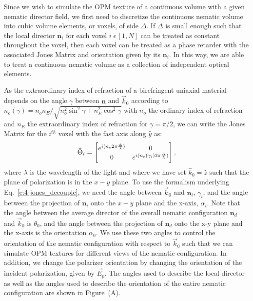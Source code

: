 Since we wish to simulate the OPM texture of a continuous volume with a given nematic director field, we first need to discretize the continuous nematic volume into cubic volume elements, or voxels, of side $\Delta$.
If $\Delta$ is small enough such that the local director $\mathbf{n}_i$ for each voxel $ i \;\epsilon \, [1,N]$ can be treated as constant throughout the voxel, then each voxel can be treated as a phase retarder with the associated Jones Matrix and orientation given by its $\mathbf{n}_i$.
In this way, we are able to treat a continuous nematic volume as a collection of independent optical elements.

As the extraordinary index of refraction of a birefringent uniaxial material depends on the angle $\gamma$ between $\mathbf{n}$ and $\vec{k}_0$ according to $n_e(\gamma) = n_o n_E/\sqrt{n^2_o \sin^2\gamma+n_E^2 \cos^2 \gamma}$ with $n_o$ the ordinary index of refraction and $n_E$ the extraordinary index of refraction for $\gamma = \pi/2$, we can write the Jones Matrix for the $i^{th}$ voxel with the fast axis along $\hat{y}$ as:
\begin{equation}
\bar{\bar{\Theta}}_i  =  \begin{bmatrix}e^{i(n_o2 \pi \frac{\Delta}{\lambda})} & 0 \\ 0 & e^{i (n_e(\gamma_i)2 \pi \frac{\Delta}{\lambda})} \end{bmatrix},
\end{equation}
where $\lambda$ is the wavelength of the light and where we have set $\hat{k}_0=\hat{z}$ such that the plane of polarization is in the $x-y$ plane.
To use the formalism underlying Eq.~\ref{e:4-jones_decouple}, we need the angle between $\vec{k}_0$ and $\mathbf{n}_i$, $\gamma_i$, and the angle between the projection of $\mathbf{n}_i$ onto the $x-y$ plane and the x-axis, $\alpha_i$.
Note that the angle between the average director of the overall nematic configuration $\mathbf{n}_d$ and $\vec{k}_0$ is $\theta_0$, and the angle between the projection of $\mathbf{n}_d$ onto the x-y plane and the x-axis is the orientation $\alpha_0$.
We use these two angles to control the orientation of the nematic configuration with respect to $\vec{k}_0$ such that we can simulate OPM textures for different views of the nematic configuration.
In addition, we change the polarizer orientation by changing the orientation of the incident polarization, given by $\vec{E}_p$.
The angles used to describe the local director as well as the angles used to describe the orientation of the entire nematic configuration are shown in Figure~(A).
